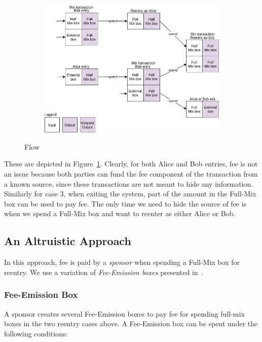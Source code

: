 \documentclass[runningheads]{llncs}
\begin{document}
\begin{figure}[h]
	\centering
	\begin{subfigure}{0.7\textwidth}
		\centering
		\includegraphics[width=\linewidth]{ErgoMixFlow.jpg}
	\end{subfigure}
	\caption{\algname Flow}
\label{fig:ergomixflow}
\end{figure}

These are depicted in Figure~\ref{fig:ergomixflow}. 
Clearly, for both Alice and Bob entries, fee is not an issue because both parties can fund the fee component of the transaction from a known source, since these transactions are not meant to hide any information. Similarly for case 3, when exiting the system, part of the amount in the Full-Mix box can be used to pay fee. The only time we need to hide the source of fee is when we spend a Full-Mix box and want to reenter as either Alice or Bob. 

\subsection{An Altruistic Approach}
\label{donation}

In this approach, fee is paid by a {\em sponsor} when spending a Full-Mix box for reentry. 
We use a variation of {\em Fee-Emission boxes} presented in~\cite{Fee-Emission}. 

\subsubsection{Fee-Emission Box}
A sponsor creates several Fee-Emission boxes to pay fee for spending full-mix boxes in the two reentry cases above. A Fee-Emission box can be spent under the following conditions:
\end{document}
